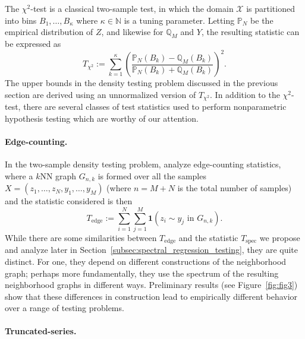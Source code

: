 \documentclass{article}
\newcommand{\1}{\mathbf{1}}
\theoremstyle{alden}
\theoremstyle{aldenthm}
\theoremstyle{definition}
\theoremstyle{remark}
\begin{document}
The $\chi^2$-test is a classical two-sample test, in which the domain $\mathcal{X}$ is partitioned into bins $B_1,\ldots,B_\kappa$ where $\kappa \in \mathbb{N}$ is a tuning parameter. Letting $\mathbb{P}_N$ be the empirical distribution of $Z$, and likewise for $\mathbb{Q}_M$ and $Y$, the resulting statistic can be expressed as 
\begin{equation}
\label{eqn:chi_squared}
T_{\chi^2} := \sum_{k = 1}^{\kappa} \left(\frac{\mathbb{P}_N(B_k) - \mathbb{Q}_M(B_k)}{\mathbb{P}_N(B_k) + \mathbb{Q}_M(B_k)}\right)^2.
\end{equation}
The upper bounds in the density testing problem discussed in the previous section are derived using an unnormalized version of $T_{\chi^2}$. In addition to the $\chi^2$-test, there are several classes of test statistics used to perform nonparametric hypothesis testing which are worthy of our attention.

\paragraph{Edge-counting.}
In the two-sample density testing problem, \citet{schilling86, bhattacharya15} analyze edge-counting statistics, where a $k$NN graph $G_{n,k}$ is formed over all the samples $X = (z_1,\ldots,z_N,y_1,\ldots,y_M)$ (where $n = M + N$ is the total number of samples) and the statistic considered is then
\begin{equation}
\label{eqn:edge_count_statistic}
T_{\textrm{edge}} := \sum_{i = 1}^{N} \sum_{j = 1}^{M} \1(z_i \sim y_j \textrm{ in } G_{n,k}).
\end{equation}
While there are some similarities between $T_{\mathrm{edge}}$ and the statistic $T_{\mathrm{spec}}$ we propose and analyze later in Section~\ref{subsec:spectral_regression_testing}, they are quite distinct. For one, they depend on different constructions of the neighborhood graph; perhaps more fundamentally, they use the spectrum of the resulting neighborhood graphs in different ways. Preliminary results (see Figure~\ref{fig:fig3}) show that these differences in construction lead to empirically different behavior over a range of testing problems.

\paragraph{Truncated-series.}
\end{document}
